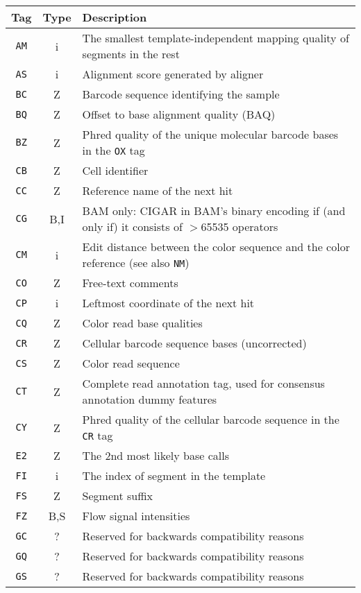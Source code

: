 \documentclass[10pt]{article}
\begin{document}
\begin{center}\small
\begin{longtable}{ccp{12.5cm}}
  \hline
  {\bf Tag} & {\bf Type} & {\bf Description} \\
  \hline
  {\tt AM} & i & The smallest template-independent mapping quality of segments in the rest \\
  {\tt AS} & i & Alignment score generated by aligner \\
  {\tt BC} & Z & Barcode sequence identifying the sample \\
  {\tt BQ} & Z & Offset to base alignment quality (BAQ) \\
  {\tt BZ} & Z & Phred quality of the unique molecular barcode bases in the {\tt OX} tag \\
  {\tt CB} & Z & Cell identifier \\
  {\tt CC} & Z & Reference name of the next hit \\
  {\tt CG} & B,I & BAM only: {\sf CIGAR} in BAM's binary encoding if (and only if) it consists of $>$65535 operators \\
  {\tt CM} & i & Edit distance between the color sequence and the color reference (see also {\tt NM}) \\
  {\tt CO} & Z & Free-text comments \\
  {\tt CP} & i & Leftmost coordinate of the next hit \\
  {\tt CQ} & Z & Color read base qualities \\
  {\tt CR} & Z & Cellular barcode sequence bases (uncorrected) \\
  {\tt CS} & Z & Color read sequence \\
  {\tt CT} & Z & Complete read annotation tag, used for consensus annotation dummy features \\
  {\tt CY} & Z & Phred quality of the cellular barcode sequence in the {\tt CR} tag \\
  {\tt E2} & Z & The 2nd most likely base calls \\
  {\tt FI} & i & The index of segment in the template \\
  {\tt FS} & Z & Segment suffix \\
  {\tt FZ} & B,S & Flow signal intensities \\
  {\tt GC} & ? & Reserved for backwards compatibility reasons \\
  {\tt GQ} & ? & Reserved for backwards compatibility reasons \\
  {\tt GS} & ? & Reserved for backwards compatibility reasons \\

\end{longtable}
\end{center}
\end{document}
